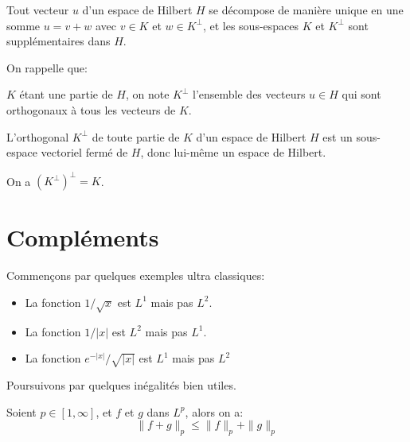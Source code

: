\medskip
{}

\begin{theoreme}
Tout vecteur $u$ d'un espace de Hilbert $H$ se décompose de manière unique en une somme $u=v+w$ avec
$v\in K$ et $w\in K^\bot$, et les sous-espaces $K$ et $K^\bot$ sont supplémentaires dans $H$.
\end{theoreme}

On rappelle que:
\begin{definition}
$K$ étant une partie de $H$, on note $K^\bot$ l'ensemble des vecteurs $u\in H$ qui sont orthogonaux à tous les
vecteurs de $K$.
\end{definition}

\begin{theoreme}
L'orthogonal $K^\bot$ de toute partie de $K$ d'un espace de Hilbert $H$ est un sous-espace vectoriel fermé de
$H$, donc lui-même un espace de Hilbert.

On a $(K^\bot)^\bot = K$.
\end{theoreme}

\medskip
\section{Compléments}

Commençons par quelques exemples ultra classiques:
\begin{itemize}
   \item La fonction $1/\sqrt{x}$ est $L^1$ mais pas $L^2$.
   \item La fonction $1/|x|$ est $L^2$ mais pas $L^1$.
   \item La fonction $e^{-|x|}/\sqrt{|x|}$ est $L^1$ mais pas $L^2$
\end{itemize}

\medskip
Poursuivons par quelques inégalités bien utiles.

\begin{theoreme}
Soient $p\in[1,\infty]$, et $f$ et $g$ dans $L^p$, alors on a:
\begin{equation}\|f+g\|_p\le\|f\|_p+\|g\|_p\end{equation}
\end{theoreme}

